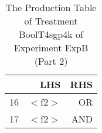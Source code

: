 \begin{table}[ht]
\centering
\begin{tabular}{rrr}
  \hline
 & LHS & RHS \\ 
  \hline
16 & $<$f2$>$ & OR \\ 
  17 & $<$f2$>$ & AND \\ 
   \hline
\end{tabular}
\caption{The Production Table of Treatment BoolT4sgp4k of Experiment ExpB (Part 2)} 
\end{table}
